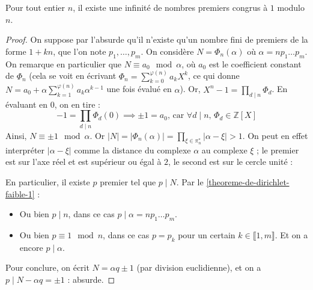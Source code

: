   \begin{theorem}
    Pour tout entier $n$, il existe une infinité de nombres premiers congrus à $1$ modulo $n$.
  \end{theorem}

  \begin{proof}
    On suppose par l'absurde qu'il n'existe qu'un nombre fini de premiers de la forme $1+kn$, que l'on note $p_1, \dots, p_m$. On considère $N = \Phi_n(\alpha)$ où $\alpha = n p_1 \dots p_m$. On remarque en particulier que $N \equiv a_0 \mod \alpha$, où $a_0$ est le coefficient constant de $\Phi_n$ (cela se voit en écrivant $\Phi_n = \sum_{k=0}^{\varphi(n)} a_k X^k$, ce qui donne $N = a_0 + \alpha \sum_{k=1}^{\varphi(n)} a_k \alpha^{k-1}$ une fois évalué en $\alpha$).
    \newpar
    Or, $X^n - 1 = \prod_{d \mid n} \Phi_d$. En évaluant en $0$, on en tire :
    \[ -1 = \prod_{d \mid n} \Phi_d(0) \implies \pm 1 = a_0 \text{, car } \forall d \mid n, \, \Phi_d \in \mathbb{Z}[X] \]
    Ainsi, $N \equiv \pm 1 \mod \alpha$. Or $|N| = |\Phi_n(\alpha)| = \prod_{\xi \in \pi_n^*} |\alpha - \xi| > 1$. On peut en effet interpréter $|\alpha - \xi|$ comme la distance du complexe $\alpha$ au complexe $\xi$ ; le premier est sur l'axe réel et est supérieur ou égal à $2$, le second est sur le cercle unité :
    \begin{center}
    \end{center}
    En particulier, il existe $p$ premier tel que $p \mid N$. Par le \cref{theoreme-de-dirichlet-faible-1} :
    \begin{itemize}
      \item Ou bien $p \mid n$, dans ce cas $p \mid \alpha = n p_1 \dots p_m$.
      \item Ou bien $p \equiv 1 \mod n$, dans ce cas $p = p_k$ pour un certain $k \in \llbracket 1, m \rrbracket$. Et on a encore $p \mid \alpha$.
    \end{itemize}
    Pour conclure, on écrit $N = \alpha q \pm 1$ (par division euclidienne), et on a $p \mid N - \alpha q = \pm 1$ : absurde.
  \end{proof}

